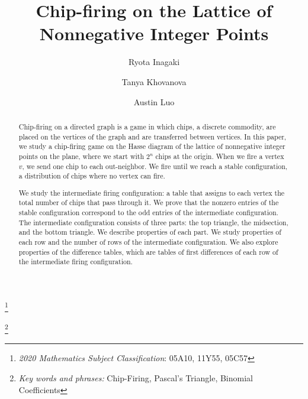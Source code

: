 \documentclass[11pt]{article}
\title{Chip-firing on the Lattice of Nonnegative Integer Points}
\author{Ryota Inagaki \and Tanya Khovanova \and Austin Luo}
\date{}
\theoremstyle{definition}
\theoremstyle{remark}
\newcommand\nnfootnote[1]{%
  \begin{NoHyper}
  \renewcommand\thefootnote{}\footnote{#1}%
  \addtocounter{footnote}{-1}%
  \end{NoHyper}
}
\begin{document}
\maketitle

\begin{abstract}
Chip-firing on a directed graph is a game in which chips, a discrete commodity, are placed on the vertices of the graph and are transferred between vertices. In this paper, we study a chip-firing game on the Hasse diagram of the lattice of nonnegative integer points on the plane, where we start with $2^n$ chips at the origin. When we fire a vertex $v$, we send one chip to each out-neighbor. We fire until we reach a stable configuration, a distribution of chips where no vertex can fire.

We study the intermediate firing configuration: a table that assigns to each vertex the total number of chips that pass through it. We prove that the nonzero entries of the stable configuration correspond to the odd entries of the intermediate configuration. The intermediate configuration consists of three parts: the top triangle, the midsection, and the bottom triangle. We describe properties of each part. We study properties of each row and the number of rows of the intermediate configuration. We also explore properties of the difference tables, which are tables of first differences of each row of the intermediate firing configuration.
\end{abstract}

\nnfootnote{\emph{2020 Mathematics Subject Classification}:  05A10, 11Y55, 05C57}
\nnfootnote{\emph{Key words and phrases:} Chip-Firing, Pascal's Triangle, Binomial Coefficients} 
\end{document}
